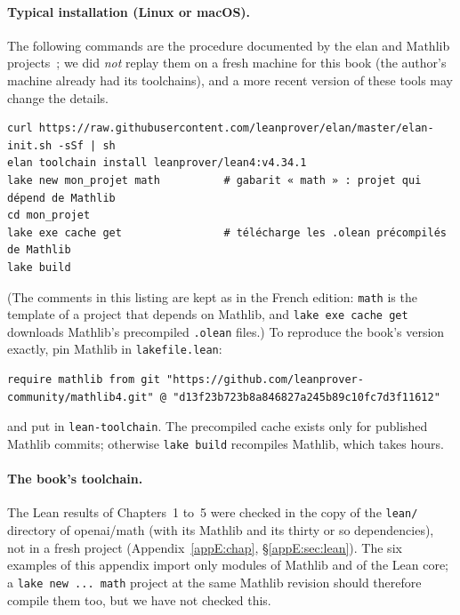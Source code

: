 \paragraph{Typical installation (Linux or macOS).} The following commands are the procedure documented by the elan and
Mathlib projects~\cite{app:elan,app:mathlibinstall}; we did \emph{not} replay them on a fresh machine for this book (the
author's machine already had its toolchains), and a more recent version of these tools may change the details.
\begin{lstlisting}[style=appC,language={}]
curl https://raw.githubusercontent.com/leanprover/elan/master/elan-init.sh -sSf | sh
elan toolchain install leanprover/lean4:v4.34.1
lake new mon_projet math          # gabarit « math » : projet qui dépend de Mathlib
cd mon_projet
lake exe cache get                # télécharge les .olean précompilés de Mathlib
lake build
\end{lstlisting}
(The comments in this listing are kept as in the French edition: \texttt{math} is the template of a project that
depends on Mathlib, and \texttt{lake exe cache get} downloads Mathlib's precompiled \texttt{.olean} files.)
To reproduce the book's version exactly, pin Mathlib in \texttt{lakefile.lean}:
\begin{lstlisting}[style=appC,language={}]
require mathlib from git "https://github.com/leanprover-community/mathlib4.git" @ "d13f23b723b8a846827a245b89c10fc7d3f11612"
\end{lstlisting}
and put  in \texttt{lean-toolchain}. The precompiled cache exists only for published
Mathlib commits; otherwise \texttt{lake build} recompiles Mathlib, which takes hours.

\paragraph{The book's toolchain.} The Lean results of Chapters~1 to~5 were checked in the copy of the \texttt{lean/}
directory of openai/math (with its Mathlib and its thirty or so dependencies), not in a fresh project
(Appendix~\ref{appE:chap}, §\ref{appE:sec:lean}). The six examples of this appendix import only modules of Mathlib and
of the Lean core; a \texttt{lake new ... math} project at the same Mathlib revision should therefore compile them too,
but we have not checked this.

